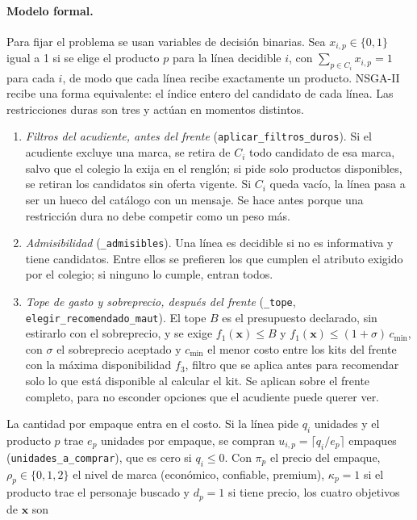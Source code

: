 \paragraph{Modelo formal.} Para fijar el problema se usan variables de decisión binarias. Sea
$x_{i,p}\in\{0,1\}$ igual a 1 si se elige el producto $p$ para la línea decidible $i$, con
$\sum_{p\in C_i}x_{i,p}=1$ para cada $i$, de modo que cada línea recibe exactamente un producto. NSGA-II recibe una forma equivalente: el índice entero del candidato de cada línea. Las restricciones duras son
tres y actúan en momentos distintos.
\begin{enumerate}[label=\textbf{R\arabic*.},leftmargin=*,itemsep=1pt,topsep=2pt]
\item \emph{Filtros del acudiente, antes del frente} (\texttt{aplicar\_filtros\_duros}). Si
el acudiente excluye una marca, se retira de $C_i$ todo candidato de esa marca, salvo que el colegio la
exija en el renglón; si pide solo productos disponibles, se retiran los
candidatos sin oferta vigente. Si $C_i$ queda vacío, la línea pasa a ser un hueco del catálogo con un
mensaje. Se hace antes porque una restricción dura no debe
competir como un peso más.
\item \emph{Admisibilidad} (\texttt{\_admisibles}). Una línea es decidible si no es informativa y
tiene candidatos. Entre ellos se prefieren los que cumplen el atributo exigido por el colegio; si
ninguno lo cumple, entran todos.
\item \emph{Tope de gasto y sobreprecio, después del frente} (\texttt{\_tope},
\texttt{elegir\_recomendado\_maut}). El tope $B$ es el presupuesto declarado, sin estirarlo con el
sobreprecio, y se exige $f_1(\mathbf{x})\leq B$ y $f_1(\mathbf{x})\leq(1+\sigma)\,c_{\min}$, con $\sigma$ el
sobreprecio aceptado y $c_{\min}$ el menor costo entre los kits del frente con la máxima disponibilidad $f_3$,
filtro que se aplica antes para recomendar solo lo que está disponible al calcular el kit. Se aplican
sobre el frente completo, para no esconder opciones que el acudiente puede querer ver.
\end{enumerate}
La cantidad por empaque entra en el costo. Si la línea pide $q_i$ unidades y el producto $p$ trae $e_p$
unidades por empaque, se compran $u_{i,p}=\lceil q_i/e_p\rceil$ empaques (\texttt{unidades\_a\_comprar}),
que es cero si $q_i\leq 0$. Con $\pi_p$ el precio del empaque, $\rho_p\in\{0,1,2\}$ el nivel de marca
(económico, confiable, premium), $\kappa_p=1$ si el producto trae el personaje buscado y $d_p=1$ si
tiene precio, los cuatro objetivos de $\mathbf{x}$ son
